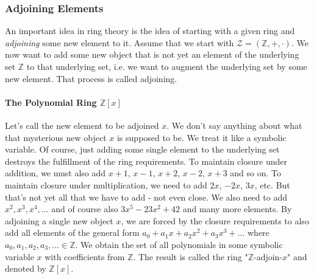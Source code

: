 

\subsubsection{Adjoining Elements}
An important idea in ring theory is the idea of starting with a given ring and \emph{adjoining} some new element to it. Assume that we start with $\mathcal{Z} = (\mathbb{Z},+,\cdot)$. We now want to add some new object that is not yet an element of the underlying set $\mathbb{Z}$ to that underlying set, i.e. we want to augment the underlying set by some new element. That process is called adjoining. 

\paragraph{The Polynomial Ring $\mathbb{Z}[x]$}
Let's call the new element to be adjoined $x$. We don't say anything about what that mysterious new object $x$ is supposed to be. We treat it like a symbolic variable. Of course, just adding some single element to the underlying set destroys the fulfillment of the ring requirements. To maintain closure under addition, we must also add $x+1$, $x-1$, $x+2$, $x-2$, $x+3$ and so on. To maintain closure under multiplication, we need to add $2 x$, $-2 x$, $3 x$, etc. But that's not yet all that we have to add - not even close. We also need to add $x^2, x^3, x^4, \ldots$ and of course also $3 x^5 - 23 x^2 + 42$ and many more elements. By adjoining a single new object $x$, we are forced by the closure requirements to also add all elements of the general form $a_0 + a_1 x + a_2 x^2 + a_3 x^3 + \ldots$ where $a_0, a_1, a_2, a_3, \ldots \in \mathbb{Z}$. We obtain the set of all polynomials in some symbolic variable $x$ with coefficients from $\mathbb{Z}$. The result is called the ring "$\mathbb{Z}$-adjoin-$x$" and denoted by $\mathbb{Z}[x]$.




